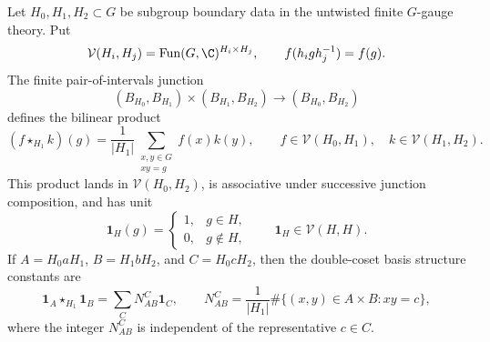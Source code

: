 \begin{proposition}
\label{prop:finite-subgroup-boundary-convolution}
Let \(H_0,H_1,H_2\subset G\) be subgroup boundary data in the untwisted
finite \(G\)-gauge theory.  Put
\[
  \mathcal V(H_i,H_j)
  =
  \operatorname{Fun}(G,\C)^{H_i\times H_j},
  \qquad
  f(h_i g h_j^{-1})=f(g).
\]
The finite pair-of-intervals junction
\[
  (B_{H_0},B_{H_1})\times(B_{H_1},B_{H_2})
  \longrightarrow
  (B_{H_0},B_{H_2})
\]
defines the bilinear product
\begin{equation}
  (f\star_{H_1}k)(g)
  =
  \frac{1}{|H_1|}
  \sum_{\substack{x,y\in G\\xy=g}} f(x)k(y),
  \qquad
  f\in\mathcal V(H_0,H_1),\quad
  k\in\mathcal V(H_1,H_2).
  \label{eq:finite-subgroup-boundary-convolution}
\end{equation}
This product lands in \(\mathcal V(H_0,H_2)\), is associative under
successive junction composition, and has unit
\[
  \mathbf 1_H(g)=
  \begin{cases}
    1,& g\in H,\\
    0,& g\notin H,
  \end{cases}
  \qquad
  \mathbf 1_H\in\mathcal V(H,H).
\]
If \(A=H_0aH_1\), \(B=H_1bH_2\), and \(C=H_0cH_2\), then the double-coset
basis structure constants are
\begin{equation}
  \mathbf 1_A\star_{H_1}\mathbf 1_B
  =
  \sum_C N_{AB}^{C}\mathbf 1_C,
  \qquad
  N_{AB}^{C}
  =
  \frac{1}{|H_1|}
  \#\{(x,y)\in A\times B:xy=c\},
  \label{eq:finite-subgroup-boundary-structure-constants}
\end{equation}
where the integer \(N_{AB}^C\) is independent of the representative
\(c\in C\).
\end{proposition}

